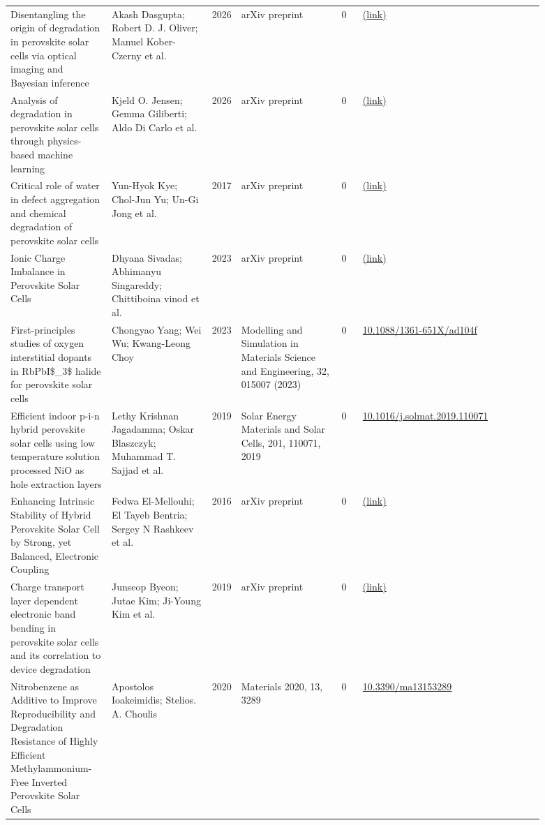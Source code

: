 \documentclass[10pt,a4paper]{article}
\begin{document}
{\begin{longtable}{p{0.197\linewidth}p{0.197\linewidth}p{0.043\linewidth}p{0.197\linewidth}p{0.043\linewidth}p{0.117\linewidth}p{0.098\linewidth}}
Disentangling the origin of degradation in perovskite solar cells via optical imaging and Bayesian inference & Akash Dasgupta; Robert D. J. Oliver; Manuel Kober-Czerny et al. & 2026 & arXiv preprint & 0 & \href{http://arxiv.org/abs/2606.13114v1}{(link)} &  \\
Analysis of degradation in perovskite solar cells through physics-based machine learning & Kjeld O. Jensen; Gemma Giliberti; Aldo Di Carlo et al. & 2026 & arXiv preprint & 0 & \href{http://arxiv.org/abs/2608.10691v1}{(link)} &  \\
Critical role of water in defect aggregation and chemical degradation of perovskite solar cells & Yun-Hyok Kye; Chol-Jun Yu; Un-Gi Jong et al. & 2017 & arXiv preprint & 0 & \href{http://arxiv.org/abs/1708.07606v3}{(link)} &  \\
Ionic Charge Imbalance in Perovskite Solar Cells & Dhyana Sivadas; Abhimanyu Singareddy; Chittiboina vinod et al. & 2023 & arXiv preprint & 0 & \href{http://arxiv.org/abs/2301.10973v1}{(link)} &  \\
First-principles studies of oxygen interstitial dopants in RbPbI\$\_3\$ halide for perovskite solar cells & Chongyao Yang; Wei Wu; Kwang-Leong Choy & 2023 & Modelling and Simulation in Materials Science and Engineering, 32, 015007 (2023) & 0 & \href{https://doi.org/10.1088/1361-651X/ad104f}{10.1088/1361-651X/ad104f} &  \\
Efficient indoor p-i-n hybrid perovskite solar cells using low temperature solution processed NiO as hole extraction layers & Lethy Krishnan Jagadamma; Oskar Blaszczyk; Muhammad T. Sajjad et al. & 2019 & Solar Energy Materials and Solar Cells, 201, 110071, 2019 & 0 & \href{https://doi.org/10.1016/j.solmat.2019.110071}{10.1016/j.solmat.2019.110071} &  \\
Enhancing Intrinsic Stability of Hybrid Perovskite Solar Cell by Strong, yet Balanced, Electronic Coupling & Fedwa El-Mellouhi; El Tayeb Bentria; Sergey N Rashkeev et al. & 2016 & arXiv preprint & 0 & \href{http://arxiv.org/abs/1604.06875v1}{(link)} &  \\
Charge transport layer dependent electronic band bending in perovskite solar cells and its correlation to device degradation & Junseop Byeon; Jutae Kim; Ji-Young Kim et al. & 2019 & arXiv preprint & 0 & \href{http://arxiv.org/abs/1910.12451v1}{(link)} &  \\
Nitrobenzene as Additive to Improve Reproducibility and Degradation Resistance of Highly Efficient Methylammonium-Free Inverted Perovskite Solar Cells & Apostolos Ioakeimidis; Stelios. A. Choulis & 2020 & Materials 2020, 13, 3289 & 0 & \href{https://doi.org/10.3390/ma13153289}{10.3390/ma13153289} &  \\

\end{longtable}}
\end{document}
